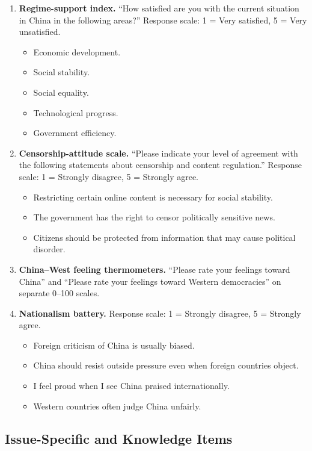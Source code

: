 \documentclass[12pt,american]{article}
\begin{document}
\begin{enumerate}[label=\arabic*., leftmargin=1.5em]
\item \textbf{Regime-support index.} ``How satisfied are you with the current situation in China in the following areas?'' Response scale: 1 = Very satisfied, 5 = Very unsatisfied.
\begin{itemize}
\item Economic development.
\item Social stability.
\item Social equality.
\item Technological progress.
\item Government efficiency.
\end{itemize}
\item \textbf{Censorship-attitude scale.} ``Please indicate your level of agreement with the following statements about censorship and content regulation.'' Response scale: 1 = Strongly disagree, 5 = Strongly agree.
\begin{itemize}
\item Restricting certain online content is necessary for social stability.
\item The government has the right to censor politically sensitive news.
\item Citizens should be protected from information that may cause political disorder.
\end{itemize}
\item \textbf{China--West feeling thermometers.} ``Please rate your feelings toward China'' and ``Please rate your feelings toward Western democracies'' on separate 0--100 scales.
\item \textbf{Nationalism battery.} Response scale: 1 = Strongly disagree, 5 = Strongly agree.
\begin{itemize}
\item Foreign criticism of China is usually biased.
\item China should resist outside pressure even when foreign countries object.
\item I feel proud when I see China praised internationally.
\item Western countries often judge China unfairly.
\end{itemize}
\end{enumerate}

\subsection{Issue-Specific and Knowledge Items}\label{app:knowledge}
\end{document}
